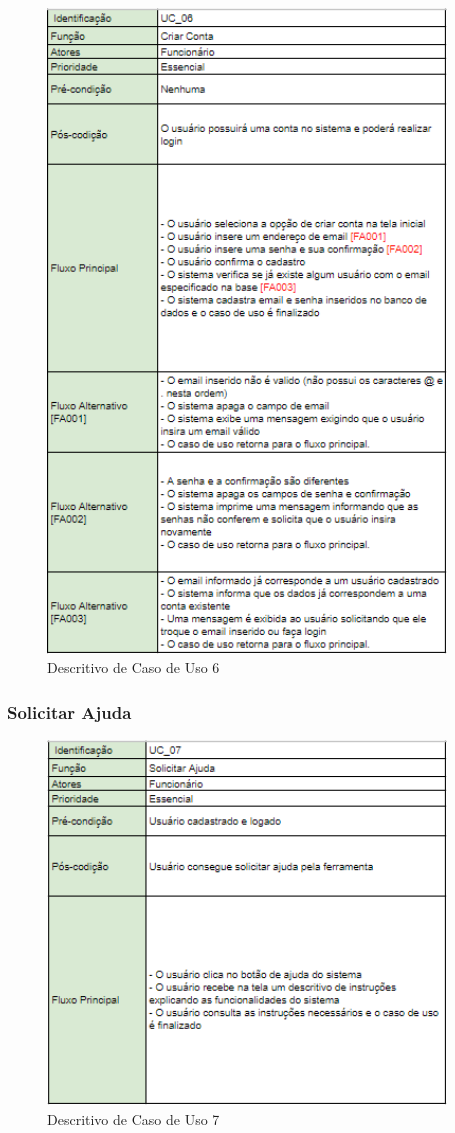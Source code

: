 \documentclass[rascunho,xindy,acronym,symbols]{fei}
\begin{document}
\begin{figure}[H]
    \centering
    \includegraphics[scale=0.6, width=300pt]{./Images/Descritivos/UC6.png}
    \caption{Descritivo de Caso de Uso 6}
     \label{fig:desc_uc6}
\end{figure}

\subsubsection{Solicitar Ajuda}

\begin{figure}[H]
    \centering
    \includegraphics[scale=0.6, width=300pt]{./Images/Descritivos/UC7.png}
    \caption{Descritivo de Caso de Uso 7}
     \label{fig:desc_uc7}
\end{figure}
\end{document}
